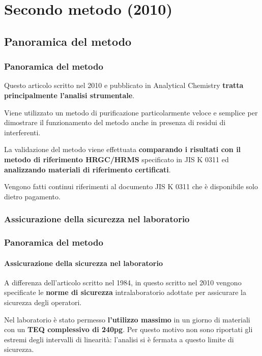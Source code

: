 \section{Secondo metodo (2010)}
\subsection{Panoramica del metodo}\begin{frame}\frametitle{Panoramica del metodo}
Questo articolo\cite{2010} scritto nel 2010 e pubblicato in Analytical Chemistry {\bf tratta principalmente l'analisi strumentale}.
\pause

Viene utilizzato un metodo di purificazione particolarmente veloce e semplice per dimostrare il funzionamento del metodo anche in presenza di residui di interferenti.
\pause

La validazione del metodo viene effettuata {\bf comparando i risultati con il metodo di riferimento HRGC/HRMS} specificato in JIS K 0311 ed  {\bf analizzando materiali di riferimento certificati}.

Vengono fatti continui riferimenti al documento JIS K 0311 che è disponibile solo dietro pagamento.

\end{frame}

\subsubsection{Assicurazione della sicurezza nel laboratorio}\begin{frame}\frametitle{Panoramica del metodo}\framesubtitle{Assicurazione della sicurezza nel laboratorio}
A differenza dell'articolo scritto nel 1984, in questo scritto nel 2010 vengono specificate le {\bf norme di sicurezza} intralaboratorio adottate per assicurare la sicurezza degli operatori. \pause

   Nel laboratorio è stato permesso {\bf l'utilizzo massimo} in un giorno di materiali con un {\bf  TEQ complessivo di 240pg}. 
Per questo motivo non sono riportati gli estremi degli intervalli di linearità: l'analisi si è fermata a questo limite di sicurezza. 




\end{frame}
